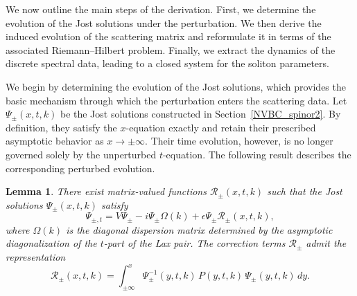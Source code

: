 \documentclass[11pt]{amsart}
\newtheorem{lemma}{Lemma}[section]
\theoremstyle{definition}
\numberwithin{equation}{section}
\begin{document}
We now outline the main steps of the derivation. First, we determine the evolution of the Jost solutions under the perturbation. We then derive the induced evolution of the scattering matrix and reformulate it in terms of the associated Riemann--Hilbert problem. Finally, we extract the dynamics of the discrete spectral data, leading to a closed system for the soliton parameters.

We begin by determining the evolution of the Jost solutions, which provides the basic mechanism through which the perturbation enters the scattering data. Let $\Psi_\pm(x,t,k)$ be the Jost solutions constructed in Section~\ref{NVBC_spinor2}. By definition, they satisfy the $x$-equation exactly and retain their prescribed asymptotic behavior as $x\to\pm\infty$. Their time evolution, however, is no longer governed solely by the unperturbed $t$-equation. The following result describes the corresponding perturbed evolution.

\begin{lemma}
\label{lem_5_1}
There exist matrix-valued functions $\mathcal{R}_\pm(x,t,k)$ such that the Jost solutions $\Psi_\pm(x,t,k)$ satisfy
\begin{equation}
\Psi_{\pm,t} = V\Psi_\pm - i\Psi_\pm \Omega(k) + \epsilon \Psi_\pm \mathcal{R}_\pm(x,t,k),
\label{eq:JostTimePerturbed4}
\end{equation}
where $\Omega(k)$ is the diagonal dispersion matrix determined by the asymptotic diagonalization of the $t$-part of the Lax pair. The correction terms $\mathcal{R}_\pm$ admit the representation
\begin{equation}
\mathcal{R}_\pm(x,t,k)=\int_{\pm\infty}^{x}\Psi_\pm^{-1}(y,t,k)\,P(y,t,k)\,\Psi_\pm(y,t,k)\,dy.
\label{eq:Rpm4}
\end{equation}
\end{lemma}
\end{document}
